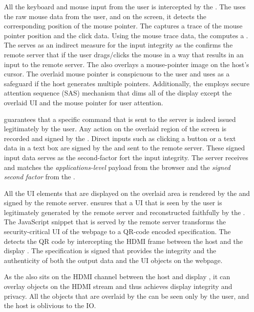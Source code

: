 \myparagraph{\Pop} All the keyboard and mouse input from the user is intercepted by the \device. The \device uses the raw mouse data from the user, and on the screen, it detects the corresponding position of the mouse pointer. The \device captures a trace of the mouse pointer position and the click data. Using the mouse trace data, the \device computes a \emph{\pop}. The \pop serves as an indirect measure for the input integrity as the \device confirms the remote server that if the user drags/clicks the mouse in a way that results in an input to the remote server. The \device also overlays a mouse-pointer image on the host's cursor. The overlaid mouse pointer is conspicuous to the user and uses as a safeguard if the host generates multiple pointers. Additionally, the \device employs secure attention sequence (SAS) mechanism that dims all of the display except the overlaid UI and the mouse pointer for user attention.

\myparagraph{\poa} \Poa guarantees that a specific command that is sent to the server is indeed issued legitimately by the user. Any action on the overlaid region of the screen is recorded and signed by the \device.  Direct inputs such as clicking a button or a text data in a text box are signed by the \device and sent to the remote server. These signed input data serves as the second-factor fort the input integrity. The server receives and matches the \emph{applications-level} payload from the browser and the \emph{signed second factor} from the \device. 

\myparagraph{\Poui} All the UI elements that are displayed on the overlaid area is rendered by the \device and signed by the remote server. \Poui ensures that a UI that is seen by the user is legitimately generated by the remote server and reconstructed faithfully by the \device. The JavaScript snippet that is served by the remote server transforms the security-critical UI of the webpage to a QR-code encoded specification. The \device detects the QR code by intercepting the HDMI frame between the host and the display \device. The specification is signed that provides the integrity and the authenticity of both the output data and the UI objects on the webpage. 

 As the \device also sits on the HDMI channel between the host and display \device, it can overlay objects on the HDMI stream and thus achieves display integrity and privacy. All the objects that are overlaid by the \device can be seen only by the user, and the host is oblivious to the IO.


\fi